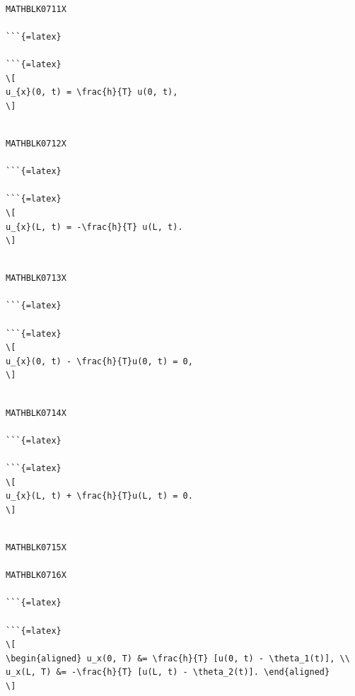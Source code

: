 \documentclass[
]{article}
\begin{document}
\begin{verbatim}

MATHBLK0711X

```{=latex}

```{=latex}
\[
u_{x}(0, t) = \frac{h}{T} u(0, t),
\]
\end{verbatim}

\begin{verbatim}

MATHBLK0712X

```{=latex}

```{=latex}
\[
u_{x}(L, t) = -\frac{h}{T} u(L, t).
\]
\end{verbatim}

\begin{verbatim}

MATHBLK0713X

```{=latex}

```{=latex}
\[
u_{x}(0, t) - \frac{h}{T}u(0, t) = 0,
\]
\end{verbatim}

\begin{verbatim}

MATHBLK0714X

```{=latex}

```{=latex}
\[
u_{x}(L, t) + \frac{h}{T}u(L, t) = 0.
\]
\end{verbatim}

\begin{verbatim}

MATHBLK0715X

MATHBLK0716X

```{=latex}

```{=latex}
\[
\begin{aligned} u_x(0, T) &= \frac{h}{T} [u(0, t) - \theta_1(t)], \\ u_x(L, T) &= -\frac{h}{T} [u(L, t) - \theta_2(t)]. \end{aligned}
\]
\end{verbatim}
\end{document}

